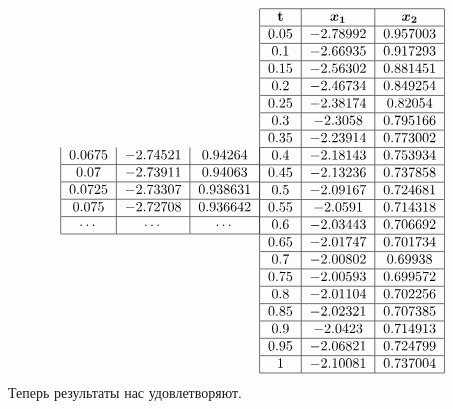 \documentclass[a4paper,11pt]{article}
\begin{document}
\begin{enumerate}[I.]
\begin{align*}
\begin{tabular}{ | c | c | c | }
      $0.0675$ & $-2.74521$ & $0.94264$ \\ \hline
      $0.07$ & $-2.73911$ & $0.94063$ \\ \hline
      $0.0725$ & $-2.73307$ & $0.938631$ \\ \hline
      $0.075$ & $-2.72708$ & $0.936642$ \\ \hline
      $\cdots$ & $\cdots$ & $\cdots$ \\ \hline
    \end{tabular}
    &\begin{tabular}{ | c | c | c | }
      \hline
      $\textbf{t}$ & \bm{$x_1$} & \bm{$x_2$} \\ \hline
      $0.05$ & $-2.78992$ & $0.957003$ \\ \hline
      $0.1$ & $-2.66935$ & $0.917293$ \\ \hline
      $0.15$ & $-2.56302$ & $0.881451$ \\ \hline
      $0.2$ & $-2.46734$ & $0.849254$ \\ \hline
      $0.25$ & $-2.38174$ & $0.82054$ \\ \hline
      $0.3$ & $-2.3058$ & $0.795166$ \\ \hline
      $0.35$ & $-2.23914$ & $0.773002$ \\ \hline
      $0.4$ & $-2.18143$ & $0.753934$ \\ \hline
      $0.45$ & $-2.13236$ & $0.737858$ \\ \hline
      $0.5$ & $-2.09167$ & $0.724681$ \\ \hline
      $0.55$ & $-2.0591$ & $0.714318$ \\ \hline
      $0.6$ & $-2.03443$ & $0.706692$ \\ \hline
      $0.65$ & $-2.01747$ & $0.701734$ \\ \hline
      $0.7$ & $-2.00802$ & $0.69938$ \\ \hline
      $0.75$ & $-2.00593$ & $0.699572$ \\ \hline
      $0.8$ & $-2.01104$ & $0.702256$ \\ \hline
      $0.85$ & $-2.02321$ & $0.707385$ \\ \hline
      $0.9$ & $-2.0423$ & $0.714913$ \\ \hline
      $0.95$ & $-2.06821$ & $0.724799$ \\ \hline
      $1$ & $-2.10081$ & $0.737004$ \\ \hline
    \end{tabular}
  \end{align*}
  Теперь результаты нас удовлетворяют.
\end{enumerate}
\newpage
\end{document}
